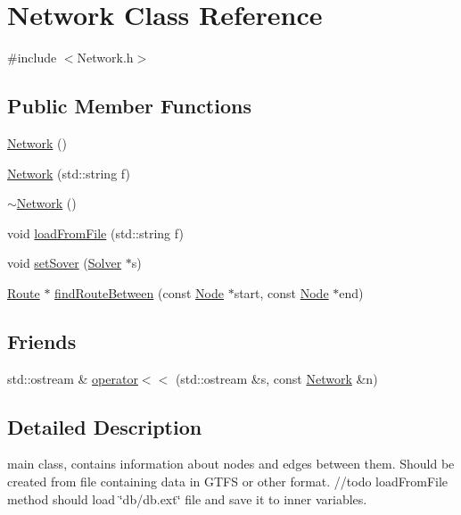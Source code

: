 \hypertarget{classNetwork}{\section{Network Class Reference}
\label{classNetwork}
}


{\ttfamily \#include $<$Network.\+h$>$}

\subsection*{Public Member Functions}
\begin{DoxyCompactItemize}
\item 
\hyperlink{classNetwork_a3cc2fb4f8fa4d507077e8da85ce5a1c8}{Network} ()
\item 
\hyperlink{classNetwork_ae31c3a6729817632007a66518978f842}{Network} (std\+::string f)
\item 
\hyperlink{classNetwork_a7a4e19cdb4bf0c7ecf82baa643831492}{$\sim$\+Network} ()
\item 
void \hyperlink{classNetwork_a3f5ada94c21af066118aab11ed06b03d}{load\+From\+File} (std\+::string f)
\item 
void \hyperlink{classNetwork_aa69082c063c2b97ab97a15d86d1e3bb2}{set\+Sover} (\hyperlink{classSolver}{Solver} $\ast$s)
\item 
\hyperlink{classRoute}{Route} $\ast$ \hyperlink{classNetwork_a07040bad8143a6280359dc50ae8eb5cd}{find\+Route\+Between} (const \hyperlink{classNode}{Node} $\ast$start, const \hyperlink{classNode}{Node} $\ast$end)
\end{DoxyCompactItemize}
\subsection*{Friends}
\begin{DoxyCompactItemize}
\item 
std\+::ostream \& \hyperlink{classNetwork_a6f20541ab6836a2f8c0971c6037f0e14}{operator$<$$<$} (std\+::ostream \&s, const \hyperlink{classNetwork}{Network} \&n)
\end{DoxyCompactItemize}


\subsection{Detailed Description}
main class, contains information about nodes and edges between them. Should be created from file containing data in G\+T\+F\+S or other format. //todo load\+From\+File method should load \char`\"{}db/db.\+ext\char`\"{} file and save it to inner variables. 

